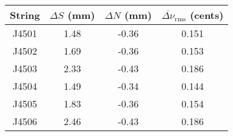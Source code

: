 \begin{tabular}{cccc}
\toprule
String & $\Delta S$ (mm) & $\Delta N$ (mm) & $\overline{\Delta \nu}_\text{rms}$ (cents) \\
\midrule
J4501 & 1.48 & -0.36 & 0.151 \\
J4502 & 1.69 & -0.36 & 0.153 \\
J4503 & 2.33 & -0.43 & 0.186 \\
J4504 & 1.49 & -0.34 & 0.144 \\
J4505 & 1.83 & -0.36 & 0.154 \\
J4506 & 2.46 & -0.43 & 0.186 \\
\bottomrule
\end{tabular}

